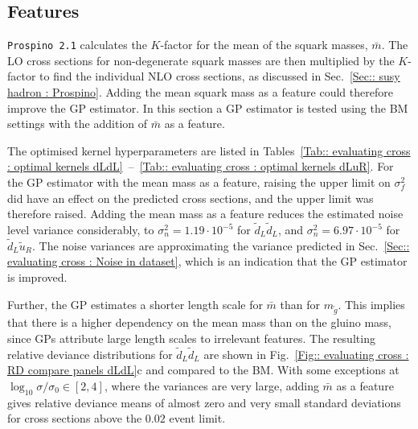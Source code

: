\documentclass[twoside,english]{uiofysmaster}
\begin{document}
{{\subsection{Features}

\verb|Prospino 2.1| calculates the $K$-factor for the mean of the squark masses, $\bar{m}$. The LO cross sections for non-degenerate squark masses are then multiplied by the $K$-factor to find the individual NLO cross sections, as discussed in Sec.~\ref{Sec:: susy hadron : Prospino}. Adding the mean squark mass as a feature could therefore improve the GP estimator. In this section a GP estimator is tested using the BM settings with the addition of $\bar{m}$ as a feature.

The optimised kernel hyperparameters are listed in Tables~\ref{Tab:: evaluating cross : optimal kernels dLdL}~--~\ref{Tab:: evaluating cross : optimal kernels dLuR}. For the GP estimator with the mean mass as a feature, raising the upper limit on $\sigma_f^2$ did have an effect on the predicted cross sections, and the upper limit was therefore raised. Adding the mean mass as a feature reduces the estimated noise level variance considerably, to $\sigma_n^2 = 1.19 \cdot 10^{-5}$ for $\widetilde{d}_L \widetilde{d}_L$, and $\sigma_n^2 = 6.97 \cdot 10^{-5}$ for $\widetilde{d}_L \widetilde{u}_R$. The noise variances are approximating the variance predicted in Sec.~\ref{Sec:: evaluating cross : Noise in dataset}, which is an indication that the GP estimator is improved. 

Further, the GP estimates a shorter length scale for $\bar{m}$ than for $m_{\widetilde{g}}$. This implies that there is a higher dependency on the mean mass than on the gluino mass, since GPs attribute large length scales to irrelevant features. The resulting relative deviance distributions for $\widetilde{d}_L \widetilde{d}_L$ are shown in Fig.~\ref{Fig:: evaluating cross : RD compare panels dLdL}c and compared to the BM. With some exceptions at $\log_{10} \sigma/\sigma_0 \in [2,4]$, where the variances are very large, adding $\bar{m}$ as a feature gives relative deviance means of almost zero and very small standard deviations for cross sections above the $0.02$ event limit. 




}}
\end{document}
